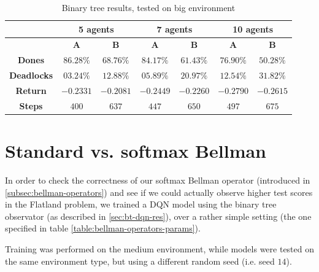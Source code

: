 \documentclass[a4paper,10pt]{report}
\begin{document}
\begin{table}[h]
	\center
	\begin{tabular}{|c|c|c|c|c|c|c|}
		\hline
							   & \multicolumn{2}{c|}{\textbf{5 agents}} & \multicolumn{2}{c|}{\textbf{7 agents}} & \multicolumn{2}{c|}{\textbf{10 agents}} \\ \hline
							   & \textbf{A} & \textbf{B} & \textbf{A} & \textbf{B} & \textbf{A} & \textbf{B} \\ \hline
		\textbf{Dones}      & $86.28\%$ & $68.76\%$ & $84.17\%$ & $61.43\%$ & $76.90\%$ & $50.28\%$ \\ \hline
		\textbf{Deadlocks}  & $03.24\%$ & $12.88\%$ & $05.89\%$ & $20.97\%$ & $12.54\%$ & $31.82\%$ \\ \hline
		\textbf{Return} & $-0.2331$ & $-0.2081$ & $-0.2449$ & $-0.2260$ & $-0.2790$ & $-0.2615$ \\ \hline
		\textbf{Steps}   & $400$ & $637$ & $447$ & $650$ & $497$ & $675$ \\ \hline
	\end{tabular}
	\caption{Binary tree results, tested on big environment}
	\label{table:bt-big-res}
\end{table}
\clearpage

\section*{Standard vs. softmax Bellman}\label{sec:bellman-operators-res}
In order to check the correctness of our softmax Bellman operator (introduced in \ref{subsec:bellman-operators}) and see if we could actually observe higher test scores in the Flatland problem, we trained a DQN model using the binary tree observator (as described in \ref{sec:bt-dqn-res}), over a rather simple setting (the one specified in table \ref{table:bellman-operators-params}). 

Training was performed on the medium environment, while models were tested on the same environment type, but using a different random seed (i.e. seed $14$).
\end{document}
